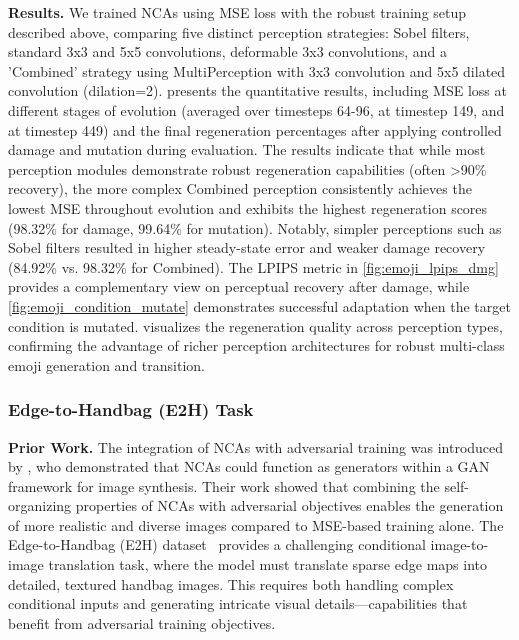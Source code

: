 \documentclass[10pt]{article} %
\begin{document}
\noindent\textbf{Results.}
We trained NCAs using MSE loss with the robust training setup described above, comparing five distinct perception strategies: Sobel filters, standard 3x3 and 5x5 convolutions, deformable 3x3 convolutions, and a 'Combined' strategy using MultiPerception with 3x3 convolution and 5x5 dilated convolution (dilation=2).  presents the quantitative results, including MSE loss at different stages of evolution (averaged over timesteps 64-96, at timestep 149, and at timestep 449) and the final regeneration percentages after applying controlled damage and mutation during evaluation. The results indicate that while most perception modules demonstrate robust regeneration capabilities (often >90\% recovery), the more complex Combined perception consistently achieves the lowest MSE throughout evolution and exhibits the highest regeneration scores (98.32\% for damage, 99.64\% for mutation). Notably, simpler perceptions such as Sobel filters resulted in higher steady-state error and weaker damage recovery (84.92\% vs. 98.32\% for Combined). The LPIPS metric in \cref{fig:emoji_lpips_dmg} provides a complementary view on perceptual recovery after damage, while \cref{fig:emoji_condition_mutate} demonstrates successful adaptation when the target condition is mutated.  visualizes the regeneration quality across perception types, confirming the advantage of richer perception architectures for robust multi-class emoji generation and transition.

\subsubsection{Edge-to-Handbag (E2H) Task}
\noindent\textbf{Prior Work.}
The integration of NCAs with adversarial training was introduced by \citep{otte2021generativeadversarialneuralcellular}, who demonstrated that NCAs could function as generators within a GAN framework for image synthesis. Their work showed that combining the self-organizing properties of NCAs with adversarial objectives enables the generation of more realistic and diverse images compared to MSE-based training alone. The Edge-to-Handbag (E2H) dataset~\citep{isola2018imagetoimagetranslationconditionaladversarial} provides a challenging conditional image-to-image translation task, where the model must translate sparse edge maps into detailed, textured handbag images. This requires both handling complex conditional inputs and generating intricate visual details—capabilities that benefit from adversarial training objectives.
\end{document}
